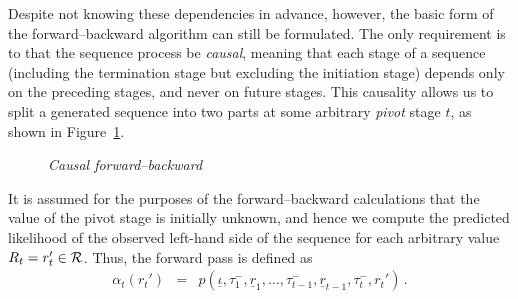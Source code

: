 \documentclass[a4paper]{article}
\newcommand{\ui}{\underline{\iota}}
\newcommand{\ur}{\underline{r}}
\begin{document}
Despite not knowing these dependencies in advance, however, the basic form of the forward--backward algorithm can still be formulated.
The only requirement is to that the sequence process be {\em causal}, meaning that each stage of a sequence
(including the termination stage but excluding the initiation stage) depends only on the preceding stages, and never on future stages.
This causality allows us to split a generated sequence into two parts at some arbitrary {\em pivot} stage $t$, as shown in Figure~\ref{fig:forwar-backard}.
\begin{figure}[hbt]
\centering
{}
\caption{\em Causal forward--backward}
\label{fig:forwar-backard}
\end{figure}
It is assumed for the purposes of the forward--backward calculations that the value of the pivot stage is initially unknown, and hence we compute 
the predicted likelihood of the observed left-hand side of the sequence for each arbitrary value $R_t=r_t'\in{\cal R}$.
Thus, the forward pass is defined as
\begin{eqnarray}
\alpha_t(r_t') & = & p(\ui,\tau_1^-,\ur_1,\ldots,\tau^-_{t-1},\ur_{t-1},\tau^-_t,r_t')\,.
\label{eq:fwd-pass}
\end{eqnarray}
\end{document}
